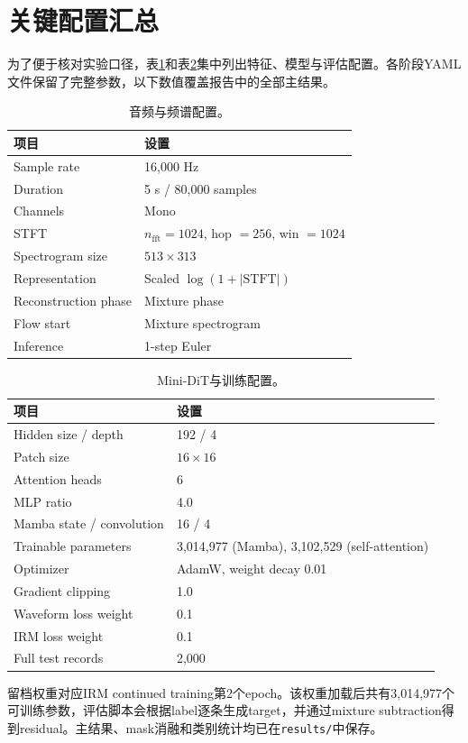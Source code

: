 \documentclass[UTF8,12pt,a4paper]{ctexart}
\newcommand{\code}[1]{\texttt{#1}}
\begin{document}
\clearpage
\appendix
\section{关键配置汇总}

为了便于核对实验口径，表\ref{tab:appendix-feature}和表\ref{tab:appendix-model}集中列出特征、模型与评估配置。各阶段YAML文件保留了完整参数，以下数值覆盖报告中的全部主结果。

\begin{table}[H]
  \centering
  \caption{音频与频谱配置。}
  \label{tab:appendix-feature}
  \begin{tabular}{ll}
    \toprule
    项目 & 设置 \\
    \midrule
    Sample rate & 16,000 Hz \\
    Duration & 5 s / 80,000 samples \\
    Channels & Mono \\
    STFT & $n_{\mathrm{fft}}=1024$, hop $=256$, win $=1024$ \\
    Spectrogram size & $513\times313$ \\
    Representation & Scaled $\log(1+|\mathrm{STFT}|)$ \\
    Reconstruction phase & Mixture phase \\
    Flow start & Mixture spectrogram \\
    Inference & 1-step Euler \\
    \bottomrule
  \end{tabular}
\end{table}

\begin{table}[H]
  \centering
  \caption{Mini-DiT与训练配置。}
  \label{tab:appendix-model}
  \begin{tabular}{ll}
    \toprule
    项目 & 设置 \\
    \midrule
    Hidden size / depth & 192 / 4 \\
    Patch size & $16\times16$ \\
    Attention heads & 6 \\
    MLP ratio & 4.0 \\
    Mamba state / convolution & 16 / 4 \\
    Trainable parameters & 3,014,977 (Mamba), 3,102,529 (self-attention) \\
    Optimizer & AdamW, weight decay 0.01 \\
    Gradient clipping & 1.0 \\
    Waveform loss weight & 0.1 \\
    IRM loss weight & 0.1 \\
    Full test records & 2,000 \\
    \bottomrule
  \end{tabular}
\end{table}

留档权重对应IRM continued training第2个epoch。该权重加载后共有3,014,977个可训练参数，评估脚本会根据label逐条生成target，并通过mixture subtraction得到residual。主结果、mask消融和类别统计均已在\code{results/}中保存。

\clearpage

{\footnotesize}
\end{document}
